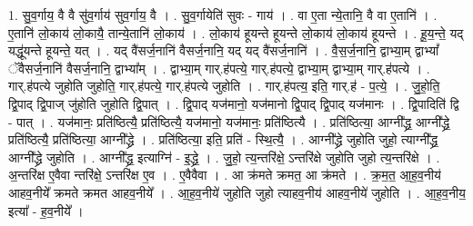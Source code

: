 \documentclass[17pt]{extarticle}
\begin{document}
1. सु॒व॒र्गाय॒ वै वै सु॑व॒र्गाय॑ सुव॒र्गाय॒ वै । . सु॒व॒र्गायेति॑ सुवः - गाय॑ । . वा ए॒ता न्ये॒तानि॒ वै वा ए॒तानि॑ । . ए॒तानि॑ लो॒काय॑ लो॒कायै॒ तान्ये॒तानि॑ लो॒काय॑ । . लो॒काय॑ हूयन्ते हूयन्ते लो॒काय॑ लो॒काय॑ हूयन्ते । . हू॒य॒न्ते॒ यद् यद्धू॑यन्ते हूयन्ते॒ यत् । . यद् वै॑सर्ज॒नानि॑ वैसर्ज॒नानि॒ यद् यद् वै॑सर्ज॒नानि॑ । . वै॒स॒र्ज॒नानि॒ द्वाभ्या॒म् द्वाभ्यां᳚ ॅवैसर्ज॒नानि॑ वैसर्ज॒नानि॒ द्वाभ्या᳚म् । . द्वाभ्या॒म् गार्.ह॑पत्ये॒ गार्.ह॑पत्ये॒ द्वाभ्या॒म् द्वाभ्या॒म् गार्.ह॑पत्ये । . गार्.ह॑पत्ये जुहोति जुहोति॒ गार्.ह॑पत्ये॒ गार्.ह॑पत्ये जुहोति । . गार्.ह॑पत्य॒ इति॒ गार्.ह॑ - प॒त्ये॒ । . जु॒हो॒ति॒ द्वि॒पाद् द्वि॒पाज् जु॑होति जुहोति द्वि॒पात् । . द्वि॒पाद् यज॑मानो॒ यज॑मानो द्वि॒पाद् द्वि॒पाद् यज॑मानः । . द्वि॒पादिति॑ द्वि - पात् । . यज॑मानः॒ प्रति॑ष्ठित्यै॒ प्रति॑ष्ठित्यै॒ यज॑मानो॒ यज॑मानः॒ प्रति॑ष्ठित्यै । . प्रति॑ष्ठित्या॒ आग्नी᳚द्ध्र॒ आग्नी᳚द्ध्रे॒ प्रति॑ष्ठित्यै॒ प्रति॑ष्ठित्या॒ आग्नी᳚द्ध्रे । . प्रति॑ष्ठित्या॒ इति॒ प्रति॑ - स्थि॒त्यै॒ । . आग्नी᳚द्ध्रे जुहोति जुहो॒ त्याग्नी᳚द्ध्र॒ आग्नी᳚द्ध्रे जुहोति । . आग्नी᳚द्ध्र॒ इत्याग्नि॑ - इ॒द्ध्रे॒ । . जु॒हो॒ त्य॒न्तरि॑क्षे॒ ऽन्तरि॑क्षे जुहोति जुहो त्य॒न्तरि॑क्षे । . अ॒न्तरि॑क्ष ए॒वैवा न्तरि॑क्षे॒ ऽन्तरि॑क्ष ए॒व । . ए॒वैवैवा । . आ क्र॑मते क्रमत॒ आ क्र॑मते । . क्र॒म॒त॒ आ॒ह॒व॒नीय॑ आहव॒नीये᳚ क्रमते क्रमत आहव॒नीये᳚ । . आ॒ह॒व॒नीये॑ जुहोति जुहो त्याहव॒नीय॑ आहव॒नीये॑ जुहोति । . आ॒ह॒व॒नीय॒ इत्या᳚ - ह॒व॒नीये᳚ । \newline
\end{document}
